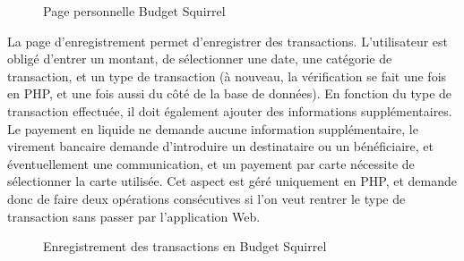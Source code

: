 \documentclass[a4paper,12pt]{article}
\begin{document}
\begin{figure}[!ht]
\noindent
{}
\caption{\footnotesize{Page personnelle Budget Squirrel}}
\end{figure}

La page d'enregistrement permet d'enregistrer des transactions. L'utilisateur est obligé d'entrer un montant, de sélectionner une date, une catégorie de transaction, et un type de transaction (à nouveau, la vérification se fait une fois en PHP, et une fois aussi du côté de la base de données). En fonction du type de transaction effectuée, il doit également ajouter des informations supplémentaires. Le payement en liquide ne demande aucune information supplémentaire, le virement bancaire demande d'introduire un destinataire ou un bénéficiaire, et éventuellement une communication, et un payement par carte nécessite de sélectionner la carte utilisée. Cet aspect est géré uniquement en PHP, et demande donc de faire deux opérations consécutives si l'on veut rentrer le type de transaction sans passer par l'application Web.

\begin{figure}[!ht]
\noindent
{}
\caption{\footnotesize{Enregistrement des transactions en Budget Squirrel}}
\end{figure}
\end{document}
